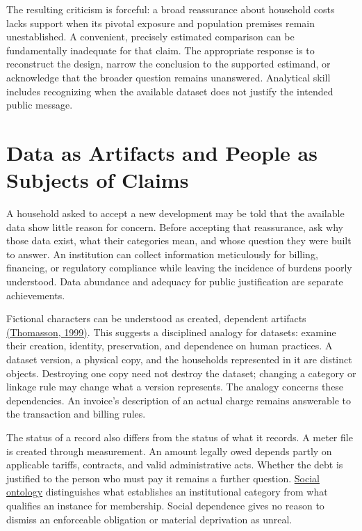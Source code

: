 The resulting criticism is forceful: a broad reassurance about household
costs lacks support when its pivotal exposure and population premises
remain unestablished. A convenient, precisely estimated comparison can
be fundamentally inadequate for that claim. The appropriate response is
to reconstruct the design, narrow the conclusion to the supported
estimand, or acknowledge that the broader question remains unanswered.
Analytical skill includes recognizing when the available dataset does
not justify the intended public message.


\hypertarget{M09-data-as-artifacts-and-people-as-subjects-of-claims}{%
\section{Data as Artifacts and People as Subjects of
Claims}\label{M09-data-as-artifacts-and-people-as-subjects-of-claims}}

\noindent \noindent A household asked to accept a new development may be told that
the available data show little reason for concern. Before accepting that
reassurance, ask why those data exist, what their categories mean, and
whose question they were built to answer. An institution can collect
information meticulously for billing, financing, or regulatory
compliance while leaving the incidence of burdens poorly understood.
Data abundance and adequacy for public justification are separate
achievements.

Fictional characters can be understood as created, dependent artifacts
\href{https://www.cambridge.org/core/books/abs/fiction-and-metaphysics/fictional-characters-as-abstract-artifacts/CE4968D080D4B81C9DE76FF589C70017}{(Thomasson,
1999)}. This suggests a disciplined analogy for datasets: examine their
creation, identity, preservation, and dependence on human practices. A
dataset version, a physical copy, and the households represented in it
are distinct objects. Destroying one copy need not destroy the dataset;
changing a category or linkage rule may change what a version
represents. The analogy concerns these dependencies. An invoice's
description of an actual charge remains answerable to the transaction
and billing rules.

The status of a record also differs from the status of what it records.
A meter file is created through measurement. An amount legally owed
depends partly on applicable tariffs, contracts, and valid
administrative acts. Whether the debt is justified to the person who
must pay it remains a further question.
\href{https://plato.stanford.edu/entries/social-ontology/}{Social
ontology} distinguishes what establishes an institutional category from
what qualifies an instance for membership. Social dependence gives no
reason to dismiss an enforceable obligation or material deprivation as
unreal.

